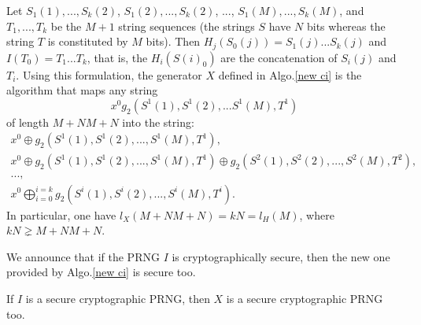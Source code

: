 Let $S_1(1),...,S_k(2)$, $S_1(2),...,S_k(2)$, ..., $S_1(M),...,
S_k(M)$, and $T_1,...,T_k$ be the $M+1$ string sequences 
(the strings $S$ have $N$ bits whereas the string $T$  is 
constituted by $M$ bits). 
Then $H_j(S_0(j)) = S_1(j) ... S_k(j)$ and 
$I(T_0) = T_1 ... T_k$, that is, the $H_i(S(i)_0)$ are the concatenation of $S_i(j)$ and 
$T_i$. 
Using this formulation, the generator $X$ defined in Algo.\ref{new ci} is
the algorithm that maps any string $$x^0 g_2(S^1(1),S^1(2),...S^1(M),T^1)$$ of length $M+NM+N$
 into the string: 
$$
\begin{array}{l}
x^0 \oplus g_2(S^1(1),S^1(2),...,S^1(M),T^1),\\ 
x^0 \oplus g_2(S^1(1),S^1(2),...,S^1(M),T^1) \oplus g_2(S^2(1),S^2(2),...,S^2(M),T^2),\\
...,\\ 
x^0 \bigoplus^{i=k}_{i=0}g_2(S^i(1),S^i(2),...,S^i(M),T^i).
\end{array}
$$
In particular, one have $ l_X(M+NM+N) = kN = l_H(M)$, where $kN \gneq M+NM+N$.

We announce that if the PRNG $I$ is cryptographically secure, then the new one provided by Algo.\ref{new ci} 
is secure too.

\begin{proposition}
\label{cryptopreuve}
If  $I$ is a secure cryptographic PRNG, then $X$ is a secure cryptographic
PRNG too.
\end{proposition}

